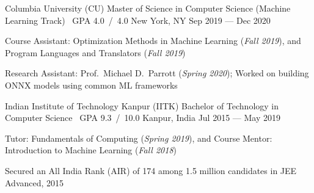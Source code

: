 

\cventry%
    {Columbia University (CU)}
	{Master of Science in Computer Science (Machine Learning Track) \acvSectionTitleSep\ GPA 4.0{\tiny\ }/{\tiny\ }4.0}
	{New York, NY}
	{Sep 2019 --- Dec 2020}
	{%
		\begin{cvitems}
            \item Course Assistant: Optimization Methods in Machine Learning
                (\textit{Fall 2019}), and Program Languages and Translators
                (\textit{Fall 2019})
            \item Research Assistant: Prof.\ Michael D.\ Parrott (\textit{Spring 2020}); Worked on building ONNX models using common ML frameworks 
		\end{cvitems}
	}

\cventry%
    {Indian Institute of Technology Kanpur (IITK)}
	{Bachelor of Technology in Computer Science \acvSectionTitleSep\ GPA 9.3{\tiny\ }/{\tiny\ }10.0}
	{Kanpur, India}
	{Jul 2015 --- May 2019}
	{%
		\begin{cvitems}
            \item Tutor: Fundamentals of Computing (\textit{Spring 2019}), and Course Mentor: Introduction to Machine Learning (\textit{Fall 2018})
			\item Secured an All India Rank (AIR) of 174 among 1.5 million candidates in JEE Advanced, 2015
		\end{cvitems}
	}

